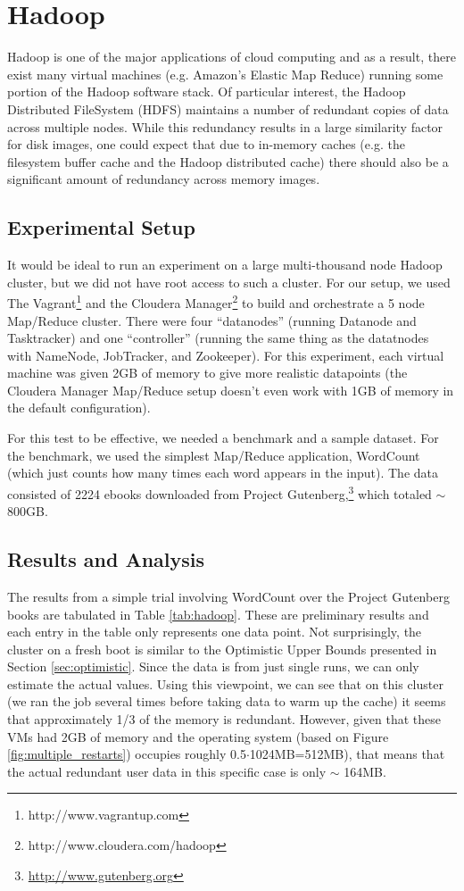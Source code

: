 \documentclass{acm_proc_article-sp}
\begin{document}
\section{Hadoop}
Hadoop is one of the major applications of cloud computing and as a result, there exist many virtual machines (e.g. Amazon's Elastic Map Reduce) running some portion of the Hadoop software stack.  Of particular interest, the Hadoop Distributed FileSystem (HDFS) maintains a number of redundant copies of data across multiple nodes.  While this redundancy results in a large similarity factor for disk images, one could expect that due to in-memory caches (e.g. the filesystem buffer cache and the Hadoop distributed cache) there should also be a significant amount of redundancy across memory images.  

\subsection{Experimental Setup}
It would be ideal to run an experiment on a  large multi-thousand node Hadoop cluster, but we did not have root access to such a cluster.  For our setup, we used The Vagrant\footnote{http://www.vagrantup.com} and the Cloudera Manager\footnote{http://www.cloudera.com/hadoop} to build and orchestrate a 5 node Map/Reduce cluster.  There were four ``datanodes'' (running Datanode and Tasktracker) and one ``controller'' (running the same thing as the datatnodes with NameNode, JobTracker, and Zookeeper).  For this experiment, each virtual machine was given 2GB of memory to give more realistic datapoints (the Cloudera Manager Map/Reduce setup doesn't even work with 1GB of memory in the default configuration).

For this test to be effective, we needed a benchmark and a sample dataset.  For the benchmark, we used the simplest Map/Reduce application, WordCount (which just counts how many times each word appears in the input).  The data consisted of 2224 ebooks downloaded from Project Gutenberg,\footnote{\url{http://www.gutenberg.org}} which totaled $\sim$ 800GB.

\subsection{Results and Analysis}\label{sec:hadoop_results}
The results from a simple trial involving WordCount over the Project Gutenberg books are tabulated in Table \ref{tab:hadoop}.  These are preliminary results and each entry in the table only represents one data point.  Not surprisingly, the cluster on a fresh boot is similar to the Optimistic Upper Bounds presented in Section \ref{sec:optimistic}.  Since the data is from just single runs, we can only estimate the actual values.  Using this viewpoint, we can see that on this cluster (we ran the job several times before taking data to warm up the cache) it seems that approximately 1/3 of the memory is redundant.  However, given that these VMs had 2GB of memory and the operating system (based on Figure \ref{fig:multiple_restarts}) occupies roughly 0.5$\cdot$1024MB=512MB), that means that the actual redundant user data in this specific case is only $\sim$ 164MB.
\end{document}
